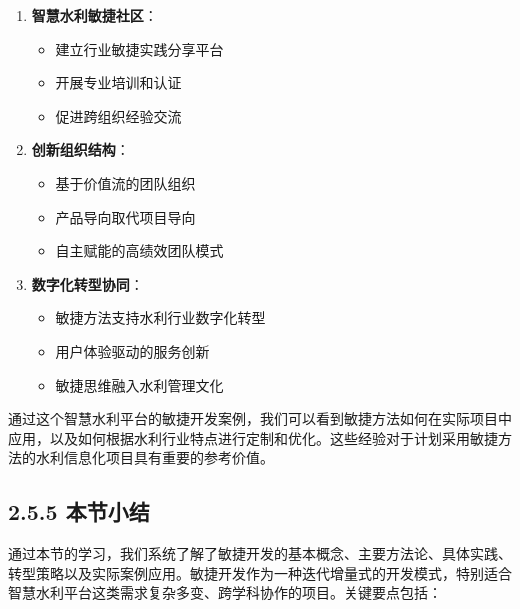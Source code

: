 \begin{enumerate}
\def\labelenumi{\arabic{enumi}.}
\tightlist
\item
  \textbf{智慧水利敏捷社区}：

  \begin{itemize}
  \tightlist
  \item
    建立行业敏捷实践分享平台
  \item
    开展专业培训和认证
  \item
    促进跨组织经验交流
  \end{itemize}
\item
  \textbf{创新组织结构}：

  \begin{itemize}
  \tightlist
  \item
    基于价值流的团队组织
  \item
    产品导向取代项目导向
  \item
    自主赋能的高绩效团队模式
  \end{itemize}
\item
  \textbf{数字化转型协同}：

  \begin{itemize}
  \tightlist
  \item
    敏捷方法支持水利行业数字化转型
  \item
    用户体验驱动的服务创新
  \item
    敏捷思维融入水利管理文化
  \end{itemize}
\end{enumerate}

通过这个智慧水利平台的敏捷开发案例，我们可以看到敏捷方法如何在实际项目中应用，以及如何根据水利行业特点进行定制和优化。这些经验对于计划采用敏捷方法的水利信息化项目具有重要的参考价值。

\subsection{2.5.5 本节小结}\label{ux672cux8282ux5c0fux7ed3}

通过本节的学习，我们系统了解了敏捷开发的基本概念、主要方法论、具体实践、转型策略以及实际案例应用。敏捷开发作为一种迭代增量式的开发模式，特别适合智慧水利平台这类需求复杂多变、跨学科协作的项目。关键要点包括：


